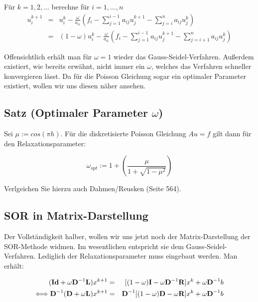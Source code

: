 Für $k = 1,2,...$ berechne für $i = 1,...,n$
\begin{eqnarray}
u_{i}^{k+1} &=& u_{i}^{k} - \frac {\omega} {a_{ii}} (f_{i} - \sum\limits_{j=1}^{i-1} a_{ij}u_{j}^{k+1} - \sum\limits_{j=i}^{n} a_{ij}u_{j}^{k}) \\
&=& (1-\omega)u_{i}^{k} - \frac {\omega} {a_{ii}} (f_{i} - \sum\limits_{j=1}^{i-1} a_{ij}u_{j}^{k+1} - \sum\limits_{j=i+1}^{n} a_{ij}u_{j}^{k})
\end{eqnarray}

Offensichtlich erhält man für $\omega = 1$ wieder das Gauss-Seidel-Verfahren. Außerdem existiert, wie bereits erwähnt, nicht immer ein $\omega$, welches das Verfahren schneller konvergieren lässt. Da für die Poisson Gleichung sogar ein optimaler Parameter existiert, wollen wir uns diesen näher ansehen.

\subsection{Satz (Optimaler Parameter $\omega$)}\label{ss.optimales omega}

Sei $\mu := cos(\pi h)$. Für die diskretisierte Poisson Gleichung $Au = f$ gilt dann für den Relaxationsparameter:

\begin{equation}
\omega_{opt} := 1 + \left( \frac {\mu} {1 + \sqrt{1 - \mu^{2}}} \right)
\end{equation}

Verlgeichen Sie hierzu auch Dahmen/Reusken (Seite 564).

\subsection{SOR in Matrix-Darstellung}\label{ss.Matrixdarstellung}

Der Vollständigkeit halber, wollen wir uns jetzt noch der Matrix-Darstellung der SOR-Methode widmen. Im wesentlichen entspricht sie dem Gauss-Seidel-Verfahren. Lediglich der Relaxationsparameter muss eingebaut werden. Man erhält:

\begin{eqnarray}
({\textbf{Id}}+\omega{\textbf{D}}^{-1}{\textbf{L}})x^{k+1} &=& [(1-\omega){\textbf{I}}-\omega{\textbf{D}}^{-1}{\textbf{R}}]x^{k} + \omega{\textbf{D}}^{-1}b \notag \\
\Longleftrightarrow {\textbf{D}}^{-1}({\textbf{D}}+\omega{\textbf{L}})x^{k+1} &=& {\textbf{D}}^{-1}[(1-\omega){\textbf{D}}-\omega{\textbf{R}}]x^{k} + \omega{\textbf{D}}^{-1}b \notag \\
\end{eqnarray}

